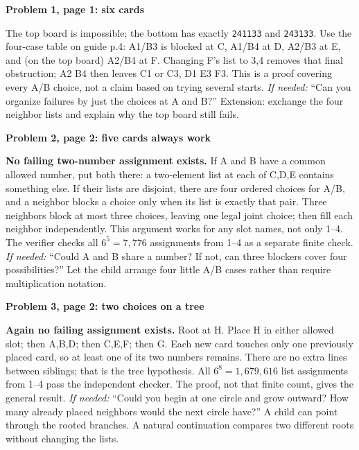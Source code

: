 \documentclass[10pt]{article}
\newcommand{\sub}[1]{\par\textbf{#1}\par}
\newcommand{\hint}[1]{\textit{If needed:} #1}
\newcommand{\word}[1]{\texttt{#1}}
\begin{document}
\sub{Problem 1, page 1: six cards}
The top board is impossible; the bottom has exactly \word{241133} and \word{243133}. Use the four-case table on guide p.4: A1/B3 is blocked at C, A1/B4 at D, A2/B3 at E, and (on the top board) A2/B4 at F. Changing F's list to 3,4 removes that final obstruction; A2 B4 then leaves C1 or C3, D1 E3 F3. This is a proof covering every A/B choice, not a claim based on trying several starts. \hint{``Can you organize failures by just the choices at A and B?''} Extension: exchange the four neighbor lists and explain why the top board still fails.

\sub{Problem 2, page 2: five cards always work}
\textbf{No failing two-number assignment exists.} If A and B have a common allowed number, put both there: a two-element list at each of C,D,E contains something else. If their lists are disjoint, there are four ordered choices for A/B, and a neighbor blocks a choice only when its list is exactly that pair. Three neighbors block at most three choices, leaving one legal joint choice; then fill each neighbor independently. This argument works for any slot names, not only 1--4. The verifier checks all $6^5=7{,}776$ assignments from 1--4 as a separate finite check. \hint{``Could A and B share a number? If not, can three blockers cover four possibilities?''} Let the child arrange four little A/B cases rather than require multiplication notation.

\sub{Problem 3, page 2: two choices on a tree}
\textbf{Again no failing assignment exists.} Root at H. Place H in either allowed slot; then A,B,D; then C,E,F; then G. Each new card touches only one previously placed card, so at least one of its two numbers remains. There are no extra lines between siblings; that is the tree hypothesis. All $6^8=1{,}679{,}616$ list assignments from 1--4 pass the independent checker. The proof, not that finite count, gives the general result. \hint{``Could you begin at one circle and grow outward? How many already placed neighbors would the next circle have?''} A child can point through the rooted branches. A natural continuation compares two different roots without changing the lists.
\end{document}
